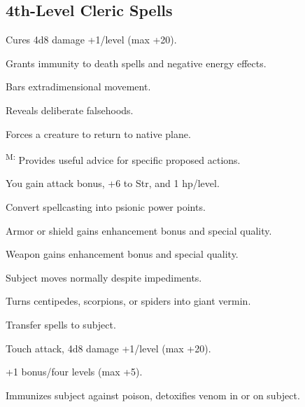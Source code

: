 



\subsection{4th-Level Cleric Spells}



 Cures 4d8 damage +1/level (max +20).

 Grants immunity to death spells and negative energy effects.

 Bars extradimensional movement.

 Reveals deliberate falsehoods.

 Forces a creature to return to native plane.

\textsuperscript{M:} Provides useful advice for specific proposed actions.

 You gain attack bonus, +6 to Str, and 1 hp/level.

 Convert spellcasting into psionic power points.

 Armor or shield gains enhancement bonus and special quality. %

 Weapon gains enhancement bonus and special quality. %

 Subject moves normally despite impediments.

 Turns centipedes, scorpions, or spiders into giant vermin.

 Transfer spells to subject.

 Touch attack, 4d8 damage +1/level (max +20).

 +1 bonus/four levels (max +5).

 Immunizes subject against poison, detoxifies venom in or on subject.

